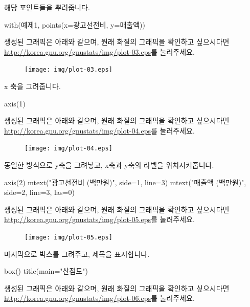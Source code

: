 해당 포인트들을 뿌려줍니다.
\begin{Schunk}
\begin{Soutput}	
with(예제1, points(x=광고선전비, y=매출액))
\end{Soutput}
\end{Schunk}
생성된 그래픽은 아래와 같으며, 원래 화질의 그래픽을 확인하고 싶으시다면 \href{http://korea.gnu.org/gnustats/img/plot-03.eps}{http://korea.gnu.org/gnustats/img/plot-03.eps}를 눌러주세요. 

\begin{figure}
\begin{center}
\texttt{[image: img/plot-03.eps]}
\end{center}
\end{figure}

x 축을 그려줍니다. 
\begin{Schunk}
\begin{Soutput}	
axis(1)
\end{Soutput}
\end{Schunk}
생성된 그래픽은 아래와 같으며, 원래 화질의 그래픽을 확인하고 싶으시다면 \href{http://korea.gnu.org/gnustats/img/plot-04.eps}{http://korea.gnu.org/gnustats/img/plot-04.eps}를 눌러주세요. 

\begin{figure}
\begin{center}
\texttt{[image: img/plot-04.eps]}
\end{center}
\end{figure}

동일한 방식으로 y축을 그려넣고, x축과 y축의 라벨을 위치시켜줍니다. 
\begin{Schunk}
\begin{Soutput}	
axis(2)
mtext("광고선전비 (백만원)", side=1, line=3)
mtext("매출액 (백만원)", side=2, line=3, las=0)
\end{Soutput}
\end{Schunk}
생성된 그래픽은 아래와 같으며, 원래 화질의 그래픽을 확인하고 싶으시다면 \href{http://korea.gnu.org/gnustats/img/plot-05.eps}{http://korea.gnu.org/gnustats/img/plot-05.eps}를 눌러주세요. 

\begin{figure}
\begin{center}
\texttt{[image: img/plot-05.eps]}
\end{center}
\end{figure}


마지막으로 박스를 그려주고, 제목을 표시합니다. 
\begin{Schunk}
\begin{Soutput}	
box()
title(main="산점도")
\end{Soutput}
\end{Schunk}
생성된 그래픽은 아래와 같으며, 원래 화질의 그래픽을 확인하고 싶으시다면 \href{http://korea.gnu.org/gnustats/img/plot-06.eps}{http://korea.gnu.org/gnustats/img/plot-06.eps}를 눌러주세요. 

